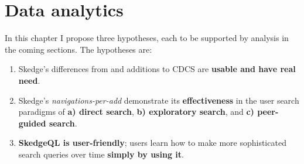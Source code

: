 
\chapter{Data analytics}

In this chapter I propose three hypotheses, each to be supported by analysis in the coming sections. The hypotheses are:

\begin{enumerate}
  \item Skedge's differences from and additions to CDCS are \textbf{usable and have real need}.

  \item Skedge’s \emph{navigations-per-add} demonstrate its \textbf{effectiveness} in the user search paradigms of \textbf{a) direct search}, \textbf{b) exploratory search}, and \textbf{c) peer-guided search}.

  \item \textbf{SkedgeQL is user-friendly}; users learn how to make more sophisticated search queries over time \textbf{simply by using it}.
\end{enumerate}


\clearpage


\clearpage


\clearpage

